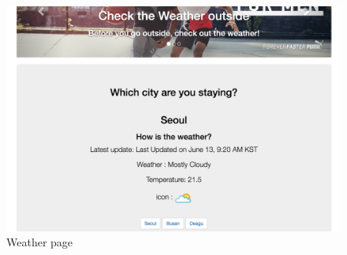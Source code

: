 \documentclass[conference]{IEEEtran}
\begin{document}
\begin{figure}[h]
\begin{center}
    \includegraphics[scale=0.25]{capture5}
    \caption{Weather page} \label{fig:label}
\end{center}
\end{figure}
\end{document}
